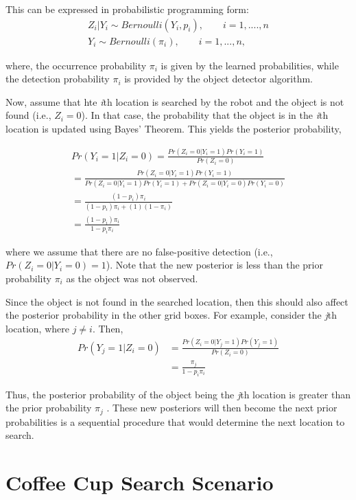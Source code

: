 This can be expressed in probabilistic programming form:
\begin{gather}
	Z_i | Y_i \sim Bernoulli (Y_i, p_i), \qquad  i  = 1,....,n \\
	Y_i \sim Bernoulli(\pi_i),\qquad   i = 1,...,n,
\end{gather}

where, the occurrence probability {$\pi_i$} is given by the learned probabilities, while the detection probability {$\pi_i$} is provided by the object detector algorithm.

Now, assume that hte \emph{i}th location is searched by the robot and the object is not found (i.e., $Z_i = 0$). In that case, the probability that the object is in the \emph{i}th location is updated using Bayes' Theorem. This yields the posterior probability,

\begin{gather*}
	Pr(Y_i = 1 | Z_i = 0) = \frac{Pr(Z_i = 0|Y_i=1)Pr(Y_i=1)} {Pr(Z_i=0)} \\
	                       = \frac{Pr(Z_i = 0| Y_i =1 )Pr(Y_i =1)}{Pr(Z_i=0|Y_i =1)Pr(Y_i = 1) + Pr(Z_i=0|Y_i=0)Pr(Y_i=0)} \\
	                       = \frac{(1 - p_i)\pi_i}{(1 - p_i)\pi_i + (1)(1 - \pi_i)} \\
	                       = \frac{(1 - p_i)\pi_i}{1 - p_i\pi_i}
\end{gather*}

where we assume that there are no false-positive detection (i.e., $Pr(Z_i =0| Y_i = 0) = 1$). Note that the new posterior is less than the prior probability $\pi_i$ as the object was not observed.

Since the object is not found in the searched location, then this should also affect the posterior probability in the other grid boxes. For example, consider the \emph{j}th location, where $j \neq i$. Then,
\begin{align*}
	Pr(Y_j = 1 | Z_i=0) &= \frac{Pr(Z_i = 0 | Y_j = 1)Pr(Y_j = 1)}{Pr(Z_i = 0)} \\
	                    &= \frac{\pi_j}{ 1 - p_i\pi_i}
\end{align*}

Thus, the posterior probability of the object being the \emph{j}th location is greater than the prior probability $\pi_j$ . These new posteriors will then become the next prior probabilities is a sequential procedure that would determine the next location to search.


\section{Coffee Cup Search Scenario}


